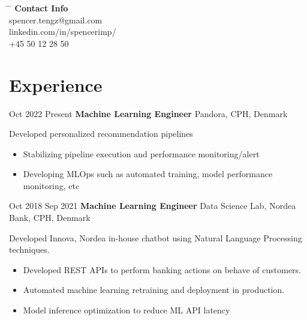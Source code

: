 \documentclass[11pt]{article} %
\begin{document}
{\begin{minipage}[t]{0.22\textwidth}
\begin{tabbing} %
\hspace{2cm} \= \hspace{2cm} \= \kill %
\textbf{Contact Info} \\ 

spencer.tengz@gmail.com \\ %
linkedin.com/in/spencerimp/ \\ %
+45 50 12 28 50 \\ %
\end{tabbing}
\end{minipage}


\section{Experience}
\job
{Oct 2022 }{Present}
{\textbf{Machine Learning Engineer}}
{}
{Pandora, CPH, Denmark}
{
	
	Developed personalized recommendation pipelines
	\begin{itemize}[itemsep=0pt]
		\item Stabilizing pipeline execution and performance monitoring/alert
		\item Developing MLOps such as automated training, model performance monitoring, etc
	\end{itemize}
}
\job
{Oct 2018 }{Sep 2021}
{\textbf{Machine Learning Engineer}}
{}
{Data Science Lab, Nordea Bank, CPH, Denmark}
{
 
    Developed Innova, Nordea in-house chatbot using Natural Language Processing techniques.
    \begin{itemize}[itemsep=0pt]
    	\item  Developed REST APIs to perform banking actions on behave of customers.
    	\item  Automated machine learning retraining and deployment in production.
    	\item  Model inference optimization to reduce ML API latency
    \end{itemize}
}

}
\end{document}
